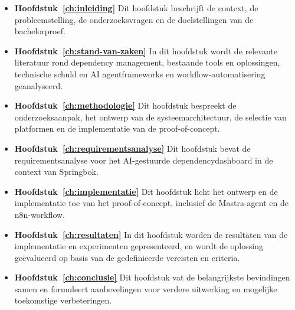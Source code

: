 \begin{itemize}
  \item \textbf{Hoofdstuk~\ref{ch:inleiding}}
        Dit hoofdstuk beschrijft de context, de probleemstelling, de onderzoeksvragen en de doelstellingen van de bachelorproef.

  \item \textbf{Hoofdstuk~\ref{ch:stand-van-zaken}}
        In dit hoofdstuk wordt de relevante literatuur rond dependency management, bestaande tools en oplossingen, technische schuld en AI agentframeworks en workflow-automatisering geanalyseerd.

  \item \textbf{Hoofdstuk~\ref{ch:methodologie}}
        Dit hoofdstuk bespreekt de onderzoeksaanpak, het ontwerp van de systeemarchitectuur, de selectie van platformen en de implementatie van de proof-of-concept.
      
  \item \textbf{Hoofdstuk~\ref{ch:requirementsanalyse}}
        Dit hoofdstuk bevat de requirementsanalyse voor het AI-gestuurde dependencydashboard in de context van Springbok.

  \item \textbf{Hoofdstuk~\ref{ch:implementatie}}
        Dit hoofdstuk licht het ontwerp en de implementatie toe van het proof-of-concept, inclusief de Mastra-agent en de n8n-workflow.

  \item \textbf{Hoofdstuk~\ref{ch:resultaten}}
        In dit hoofdstuk worden de resultaten van de implementatie en experimenten gepresenteerd, en wordt de oplossing geëvalueerd op basis van de gedefinieerde vereisten en criteria.

  \item \textbf{Hoofdstuk~\ref{ch:conclusie}}
        Dit hoofdstuk vat de belangrijkste bevindingen samen en formuleert aanbevelingen voor verdere uitwerking en mogelijke toekomstige verbeteringen.
\end{itemize}